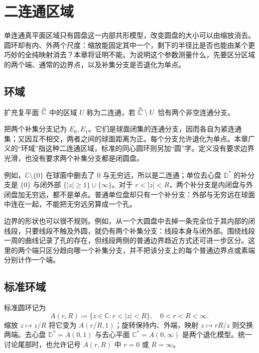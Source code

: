\section{二连通区域}
\label{b3:sec:0801}

单连通真平面区域只有圆盘这一内部共形模型，改变圆盘的大小可以由缩放消去。圆环却有内、外两个尺度：缩放能固定其中一个，剩下的半径比是否也能由某个更巧妙的全纯映射消去？本章将证明不能。为说明这个参数测量什么，先要区分区域的两个端、通常的边界点，以及补集分支是否退化为单点。

\subsection{环域}
\label{b3:subsec:080101}

\begin{definition}\label{b3:def:08-doubly-connected}
扩充复平面 \(\widehat{\mathbb C\kern0pt}\) 中的区域 \(U\) 称为二连通，若 \(\widehat{\mathbb C\kern0pt}\setminus U\) 恰有两个非空连通分支。
\end{definition}
把两个补集分支记为 \(E_0,E_1\)。它们是球面闭集的连通分支，因而各自为紧连通集；又因互不相交，两者之间的球面距离为正。每个分支允许退化为单点。本章广义的“环域”指这种二连通区域，标准的同心圆环则另加“圆”字。定义没有要求边界光滑，也没有要求两个补集分支都是闭圆盘。

\ProseParagraphBreak
例如，\(\mathbb C\setminus\{0\}\) 在球面中删去了 \(0\) 与无穷远，所以是二连通；单位去心盘 \(\mathbb D^*\) 的补分支是 \(\{0\}\) 与闭外部 \(\{|z|\ge1\}\cup\{\infty\}\)。对于 \(r<|z|<R\)，两个补分支是内闭盘与外闭盘加无穷远，都不是单点。普通单位盘却只有一个补分支：外部与无穷远在球面中连在一起，不能把无穷远另算成一个孔。

\ProseParagraphBreak
边界的形状也可以很不规则。例如，从一个大圆盘中去掉一条完全位于其内部的闭线段，只要线段不触及外圆，就仍有两个补集分支：线段本身与闭外部。围绕线段一周的曲线记录了孔的存在，但线段两侧的普通边界趋近方式还可进一步区分。这里的两个端只区分趋向哪一个补集分支，并不把该分支上的每个普通边界点或素端分别计作一个端。

\subsection{标准环域}
\label{b3:subsec:080102}

标准圆环记为
\[
 A(r,R)\coloneqq\{z\in\mathbb C:r<|z|<R\},
 \quad 0<r<R<\infty.
\]
缩放 \(z\mapsto z/R\) 将它变为 \(A(r/R,1)\)；旋转保持内、外端，映射 \(z\mapsto rR/z\) 则交换两端。去心盘 \(\mathbb D^*=A(0,1)\) 与去心平面 \(\mathbb C^*=A(0,\infty)\) 是两个退化模型。统一讨论尾部时，也允许记号 \(A(r,R)\) 中 \(r=0\) 或 \(R=\infty\)。

